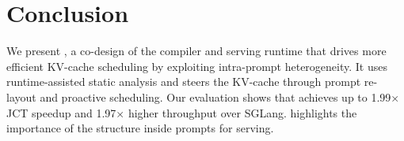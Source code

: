\section{Conclusion}
\label{sec:conclusion}
We present \sysname, a co-design of the compiler and serving runtime that drives more efficient KV-cache scheduling by exploiting intra-prompt heterogeneity. It uses runtime-assisted static analysis and steers the KV-cache through prompt re-layout and proactive scheduling. Our evaluation shows that \sysname achieves up to 1.99$\times$ JCT speedup and 1.97$\times$ higher throughput over SGLang. \sysname highlights the importance of the structure inside prompts for serving.